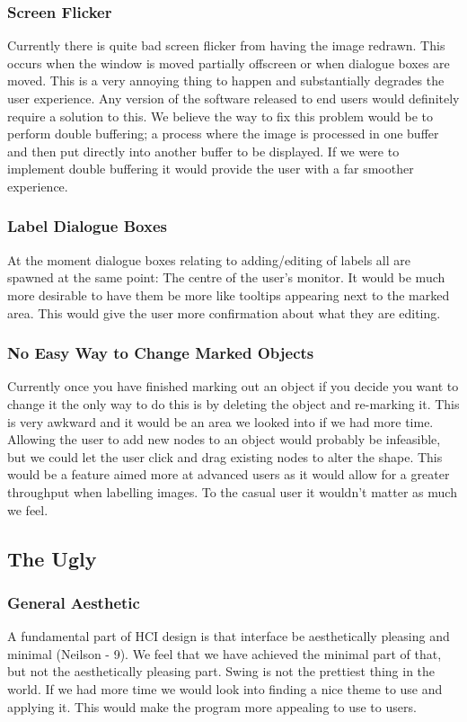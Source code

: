 \documentclass[a4paper,11pt,oneside]{article}
\begin{document}
\subsubsection{Screen Flicker}
Currently there is quite bad screen flicker from having the image redrawn.  This
occurs when the window is moved partially offscreen or when dialogue boxes are
moved.  This is a very annoying thing to happen and substantially degrades the
user experience. Any version of the software released to end users would
definitely require a solution to this.  We believe the way to fix this problem
would be to perform double buffering; a process where the image is processed in
one buffer and then put directly into another buffer to be displayed.  If we
were to implement double buffering it would provide the user with a far smoother
experience.

\subsubsection{Label Dialogue Boxes}
At the moment dialogue boxes relating to adding/editing of labels all are
spawned at the same point: The centre of the user's monitor.  It would be much
more desirable to have them be more like tooltips appearing next to the marked
area.  This would give the user more confirmation about what they are editing.

\subsubsection{No Easy Way to Change Marked Objects}
Currently once you have finished marking out an object if you decide you want to
change it the only way to do this is by deleting the object and re-marking it.
This is very awkward and it would be an area we looked into if we had more time.
Allowing the user to add new nodes to an object would probably be infeasible, 
but we could let the user click and drag existing nodes to alter the shape.  
This would be a feature aimed more at advanced users as it would allow for a
greater throughput when labelling images.  To the casual user it wouldn't matter
as much we feel.

\subsection{The Ugly}
\subsubsection{General Aesthetic}
A fundamental part of HCI design is that interface be aesthetically pleasing and
minimal (Neilson - 9).  We feel that we have achieved the minimal part of that,
but not the aesthetically pleasing part.  Swing is not the prettiest thing in
the world.  If we had more time we would look into finding a nice theme to use
and applying it.  This would make the program more appealing to use to users.
\end{document}
